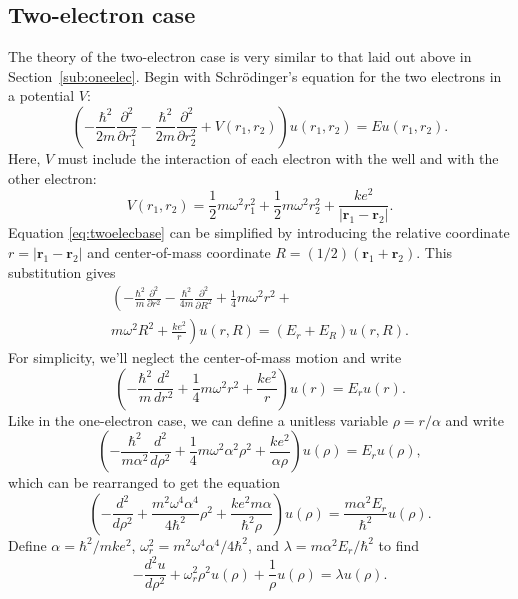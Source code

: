 \documentclass[aps,prc,reprint]{revtex4-1}
\begin{document}
    \subsection{Two-electron case}
    \label{sub:twoelec}
        The theory of the two-electron case is very similar to that laid out above in Section~\ref{sub:oneelec}. Begin with Schr\"odinger's equation for the two electrons in a potential $V$:
        \begin{equation}
            \left( -\frac{\hbar^2}{2m} \frac{\partial^2}{\partial r_1^2} - \frac{\hbar^2}{2m} \frac{\partial^2}{\partial r_2^2} + V(r_1, r_2) \right) u(r_1, r_2) = Eu(r_1, r_2).  \label{eq:twoelecbase}
        \end{equation}
        Here, $V$ must include the interaction of each electron with the well and with the other electron:
        \begin{equation*}
            V(r_1, r_2) = \frac{1}{2}m\omega^2 r_1^2 + \frac{1}{2}m\omega^2 r_2^2 + \frac{ke^2}{|\mathbf{r}_1 - \mathbf{r}_2|}.
        \end{equation*}
        Equation \ref{eq:twoelecbase} can be simplified by introducing the relative coordinate $r = |\mathbf{r}_1 - \mathbf{r}_2|$ and center-of-mass coordinate $R = (1/2)(\mathbf{r}_1 + \mathbf{r}_2)$. This substitution gives
        \begin{multline*}
            \left( -\frac{\hbar^2}{m}\frac{\partial^2}{\partial r^2} - \frac{\hbar^2}{4m}\frac{\partial^2}{\partial R^2} + \frac{1}{4}m\omega^2 r^2 +{} \right.\\\left. m\omega^2 R^2  + \frac{ke^2}{r} \right) u(r,R) = (E_r + E_R) u(r,R).
        \end{multline*}
        For simplicity, we'll neglect the center-of-mass motion and write
        \begin{equation*}
            \left( -\frac{\hbar^2}{m}\frac{d^2}{dr^2} + \frac{1}{4}m\omega^2 r^2 + \frac{ke^2}{r} \right) u(r) = E_r u(r).
        \end{equation*}
        Like in the one-electron case, we can define a unitless variable $\rho = r / \alpha$ and write
        \begin{equation*}
            \left( -\frac{\hbar^2}{m\alpha^2}\frac{d^2}{d\rho^2} + \frac{1}{4}m\omega^2\alpha^2 \rho^2 + \frac{ke^2}{\alpha\rho} \right) u(\rho) = E_r u(\rho),
        \end{equation*}
        which can be rearranged to get the equation
        \begin{equation*}
            \left( -\frac{d^2}{d\rho^2} + \frac{m^2\omega^4\alpha^4}{4\hbar^2} \rho^2 + \frac{ke^2m\alpha}{\hbar^2\rho} \right) u(\rho) = \frac{m\alpha^2E_r}{\hbar^2} u(\rho).
        \end{equation*}
        Define $\alpha = \hbar^2 / mke^2$, $\omega_r^2 = m^2\omega^4\alpha^4 / 4\hbar^2$, and $\lambda = m\alpha^2E_r / \hbar^2$ to find
        \begin{equation}
            -\frac{d^2 u}{d\rho^2} + \omega_r^2 \rho^2 u(\rho) + \frac{1}{\rho} u(\rho) = \lambda u(\rho). \label{eq:twoelecfinal}
        \end{equation}
\end{document}
